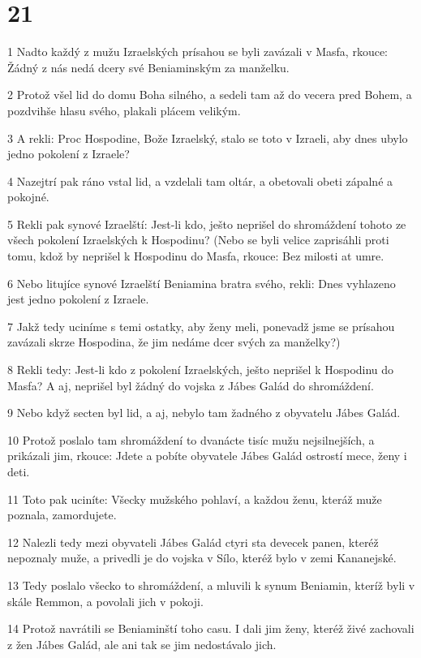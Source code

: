 \chapter{21}

\par 1 Nadto každý z mužu Izraelských prísahou se byli zavázali v Masfa, rkouce: Žádný z nás nedá dcery své Beniaminským za manželku.
\par 2 Protož všel lid do domu Boha silného, a sedeli tam až do vecera pred Bohem, a pozdvihše hlasu svého, plakali plácem velikým.
\par 3 A rekli: Proc Hospodine, Bože Izraelský, stalo se toto v Izraeli, aby dnes ubylo jedno pokolení z Izraele?
\par 4 Nazejtrí pak ráno vstal lid, a vzdelali tam oltár, a obetovali obeti zápalné a pokojné.
\par 5 Rekli pak synové Izraelští: Jest-li kdo, ješto neprišel do shromáždení tohoto ze všech pokolení Izraelských k Hospodinu? (Nebo se byli velice zaprisáhli proti tomu, kdož by neprišel k Hospodinu do Masfa, rkouce: Bez milosti at umre.
\par 6 Nebo litujíce synové Izraelští Beniamina bratra svého, rekli: Dnes vyhlazeno jest jedno pokolení z Izraele.
\par 7 Jakž tedy uciníme s temi ostatky, aby ženy meli, ponevadž jsme se prísahou zavázali skrze Hospodina, že jim nedáme dcer svých za manželky?)
\par 8 Rekli tedy: Jest-li kdo z pokolení Izraelských, ješto neprišel k Hospodinu do Masfa? A aj, neprišel byl žádný do vojska z Jábes Galád do shromáždení.
\par 9 Nebo když secten byl lid, a aj, nebylo tam žadného z obyvatelu Jábes Galád.
\par 10 Protož poslalo tam shromáždení to dvanácte tisíc mužu nejsilnejších, a prikázali jim, rkouce: Jdete a pobíte obyvatele Jábes Galád ostrostí mece, ženy i deti.
\par 11 Toto pak uciníte: Všecky mužského pohlaví, a každou ženu, kteráž muže poznala, zamordujete.
\par 12 Nalezli tedy mezi obyvateli Jábes Galád ctyri sta devecek panen, kteréž nepoznaly muže, a privedli je do vojska v Sílo, kteréž bylo v zemi Kananejské.
\par 13 Tedy poslalo všecko to shromáždení, a mluvili k synum Beniamin, kteríž byli v skále Remmon, a povolali jich v pokoji.
\par 14 Protož navrátili se Beniaminští toho casu. I dali jim ženy, kteréž živé zachovali z žen Jábes Galád, ale ani tak se jim nedostávalo jich.

